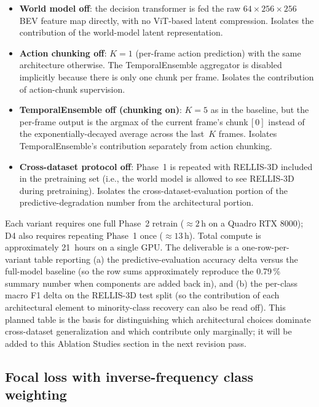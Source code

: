 \documentclass[sensors,article,submit,pdftex,moreauthors]{Definitions/mdpi}
\begin{document}
\begin{itemize}
    \item[\textbf{D1}] \textbf{World model off}: the decision transformer is fed the raw $64\times256\times256$ BEV feature map directly, with no ViT-based latent compression. Isolates the contribution of the world-model latent representation.
    \item[\textbf{D2}] \textbf{Action chunking off}: $K{=}1$ (per-frame action prediction) with the same architecture otherwise. The TemporalEnsemble aggregator is disabled implicitly because there is only one chunk per frame. Isolates the contribution of action-chunk supervision.
    \item[\textbf{D3}] \textbf{TemporalEnsemble off (chunking on)}: $K{=}5$ as in the baseline, but the per-frame output is the argmax of the current frame's chunk\,$[0]$ instead of the exponentially-decayed average across the last~$K$ frames. Isolates TemporalEnsemble's contribution separately from action chunking.
    \item[\textbf{D4}] \textbf{Cross-dataset protocol off}: Phase~1 is repeated with RELLIS-3D included in the pretraining set (i.e., the world model is allowed to see RELLIS-3D during pretraining). Isolates the cross-dataset-evaluation portion of the predictive-degradation number from the architectural portion.
\end{itemize}

Each variant requires one full Phase~2 retrain ($\approx 2$\,h on a Quadro RTX 8000); D4 also requires repeating Phase~1 once ($\approx 13$\,h). Total compute is approximately 21~hours on a single GPU. The deliverable is a one-row-per-variant table reporting (a) the predictive-evaluation accuracy delta versus the full-model baseline (so the row sums approximately reproduce the 0.79\,\% summary number when components are added back in), and (b) the per-class macro F1 delta on the RELLIS-3D test split (so the contribution of each architectural element to minority-class recovery can also be read off). This planned table is the basis for distinguishing which architectural choices dominate cross-dataset generalization and which contribute only marginally; it will be added to this Ablation Studies section in the next revision pass.

\subsection{Focal loss with inverse-frequency class weighting}
\label{sec:ablation_focal}
\end{document}
